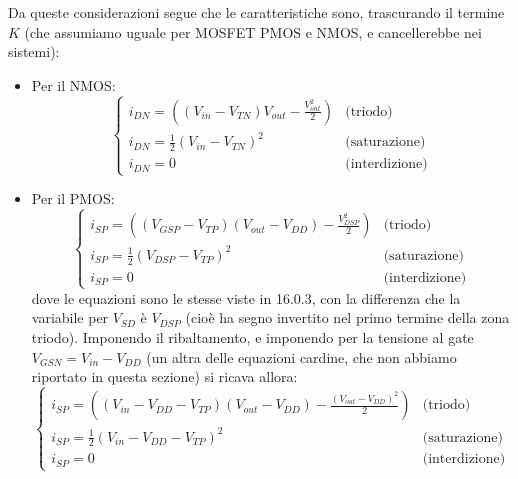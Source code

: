 \documentclass[a4paper,11pt]{article}
\begin{document}
Da queste considerazioni segue che le caratteristiche sono, trascurando il termine $K$ (che assumiamo uguale per MOSFET PMOS e NMOS, e cancellerebbe nei sistemi):
\begin{itemize}
\item Per il NMOS:
$$
\begin{cases}
	i_{DN}=\left(\left(V_{in}-V_{TN}\right)V_{out}-\frac{V_{out}^{2}}{2}\right) & \text{(triodo)} \\
	i_{DN}=\frac{1}{2}\left(V_{in}-V_{TN}\right)^{2} & \text{(saturazione)} \\
	i_{DN}=0 & \text{(interdizione)}
\end{cases}
$$
\item Per il PMOS:
$$
\begin{cases}
	i_{SP}=\left(\left(V_{GSP}-V_{TP}\right)\left(V_{out}-V_{DD}\right)-\frac{V_{DSP}^{2}}{2}\right) & \text{(triodo)}\\
	i_{SP}=\frac{1}{2}\left(V_{DSP}-V_{TP}\right)^{2} & \text{(saturazione)} \\
	i_{SP}=0 & \text{(interdizione)}
\end{cases}
$$
dove le equazioni sono le stesse viste in 16.0.3, con la differenza che la variabile per $V_{SD}$ è $V_{DSP}$ (cioè ha segno invertito nel primo termine della zona triodo). 
Imponendo il ribaltamento, e imponendo per la tensione al gate $V_{GSN} = V_{in} - V_{DD}$ (un altra delle equazioni cardine, che non abbiamo riportato in questa sezione) si ricava allora:
$$
\begin{cases}
i_{SP}=\left(\left(V_{in}-V_{DD}-V_{TP}\right)\left(V_{out}-V_{DD}\right)-\frac{\left(V_{out}-V_{DD}\right)^{2}}{2}\right) & \text{(triodo)}\\
i_{SP}=\frac{1}{2}\left(V_{in}-V_{DD}-V_{TP}\right)^{2} & \text{(saturazione)} \\
i_{SP}=0 & \text{(interdizione)}
\end{cases}
$$
\end{itemize}
\end{document}

